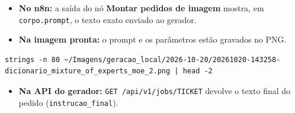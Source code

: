 \begin{itemize}
\item 
\textbf{No n8n:} a saída do nó \textbf{Montar pedidos de imagem} mostra, em \texttt{corpo.prompt}, o texto exato enviado ao gerador.


\item 
\textbf{Na imagem pronta:} o prompt e os parâmetros estão gravados no PNG.


\end{itemize}

\begin{lstlisting}
strings -n 80 ~/Imagens/geracao_local/2026-10-20/20261020-143258-dicionario_mixture_of_experts_moe_2.png | head -2
\end{lstlisting}

\begin{itemize}
\item 
\textbf{Na API do gerador:} \texttt{GET /api/v1/jobs/TICKET} devolve o texto final do pedido (\nolinkurl{instrucao_final}).


\end{itemize}
